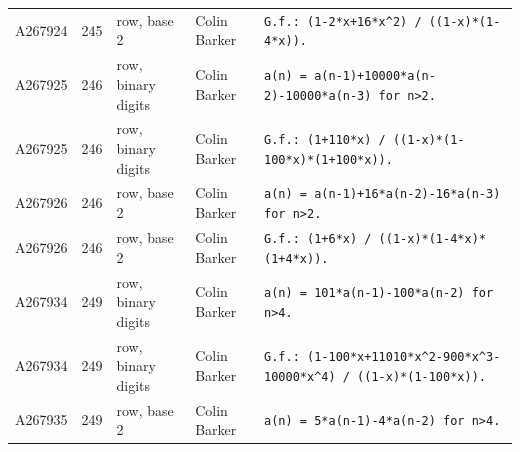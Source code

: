 \documentclass[11pt]{article}
\theoremstyle{definition}
\theoremstyle{remark}
\begin{document}
{\begin{longtable}{p{1.3cm}p{0.7cm}p{2.4cm}p{2.3cm}p{7.3cm}}
A267924 & 245 & row, base 2 & Colin Barker & \texttt{G.f.: \allowbreak{}(1-\allowbreak{}2*\allowbreak{}x+\allowbreak{}16*\allowbreak{}x\^{}2)\allowbreak{} \allowbreak{}/\allowbreak{} \allowbreak{}((1-\allowbreak{}x)\allowbreak{}*\allowbreak{}(1-\allowbreak{}4*\allowbreak{}x)\allowbreak{})\allowbreak{}.} \\
A267925 & 246 & row, binary digits & Colin Barker & \texttt{a(n)\allowbreak{} \allowbreak{}=\allowbreak{} \allowbreak{}a(n-\allowbreak{}1)\allowbreak{}+\allowbreak{}10000*\allowbreak{}a(n-\allowbreak{}2)\allowbreak{}-\allowbreak{}10000*\allowbreak{}a(n-\allowbreak{}3)\allowbreak{} \allowbreak{}for \allowbreak{}n>2.} \\
A267925 & 246 & row, binary digits & Colin Barker & \texttt{G.f.: \allowbreak{}(1+\allowbreak{}110*\allowbreak{}x)\allowbreak{} \allowbreak{}/\allowbreak{} \allowbreak{}((1-\allowbreak{}x)\allowbreak{}*\allowbreak{}(1-\allowbreak{}100*\allowbreak{}x)\allowbreak{}*\allowbreak{}(1+\allowbreak{}100*\allowbreak{}x)\allowbreak{})\allowbreak{}.} \\
A267926 & 246 & row, base 2 & Colin Barker & \texttt{a(n)\allowbreak{} \allowbreak{}=\allowbreak{} \allowbreak{}a(n-\allowbreak{}1)\allowbreak{}+\allowbreak{}16*\allowbreak{}a(n-\allowbreak{}2)\allowbreak{}-\allowbreak{}16*\allowbreak{}a(n-\allowbreak{}3)\allowbreak{} \allowbreak{}for \allowbreak{}n>2.} \\
A267926 & 246 & row, base 2 & Colin Barker & \texttt{G.f.: \allowbreak{}(1+\allowbreak{}6*\allowbreak{}x)\allowbreak{} \allowbreak{}/\allowbreak{} \allowbreak{}((1-\allowbreak{}x)\allowbreak{}*\allowbreak{}(1-\allowbreak{}4*\allowbreak{}x)\allowbreak{}*\allowbreak{}(1+\allowbreak{}4*\allowbreak{}x)\allowbreak{})\allowbreak{}.} \\
A267934 & 249 & row, binary digits & Colin Barker & \texttt{a(n)\allowbreak{} \allowbreak{}=\allowbreak{} \allowbreak{}101*\allowbreak{}a(n-\allowbreak{}1)\allowbreak{}-\allowbreak{}100*\allowbreak{}a(n-\allowbreak{}2)\allowbreak{} \allowbreak{}for \allowbreak{}n>4.} \\
A267934 & 249 & row, binary digits & Colin Barker & \texttt{G.f.: \allowbreak{}(1-\allowbreak{}100*\allowbreak{}x+\allowbreak{}11010*\allowbreak{}x\^{}2-\allowbreak{}900*\allowbreak{}x\^{}3-\allowbreak{}10000*\allowbreak{}x\^{}4)\allowbreak{} \allowbreak{}/\allowbreak{} \allowbreak{}((1-\allowbreak{}x)\allowbreak{}*\allowbreak{}(1-\allowbreak{}100*\allowbreak{}x)\allowbreak{})\allowbreak{}.} \\
A267935 & 249 & row, base 2 & Colin Barker & \texttt{a(n)\allowbreak{} \allowbreak{}=\allowbreak{} \allowbreak{}5*\allowbreak{}a(n-\allowbreak{}1)\allowbreak{}-\allowbreak{}4*\allowbreak{}a(n-\allowbreak{}2)\allowbreak{} \allowbreak{}for \allowbreak{}n>4.} \\

\end{longtable}}
\end{document}
